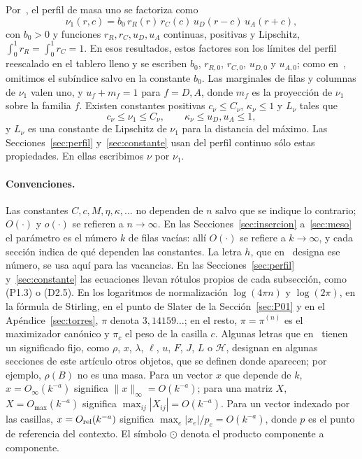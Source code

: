 Por~\cite[Teoremas~1.2 y~1.3 y Proposición~5.2]{Perfil}, el perfil de masa uno se factoriza como
\begin{equation}\label{eq:factorizacion}
 \nu_1(r,c)=b_0\,r_R(r)\,r_C(c)\,u_D(r-c)\,u_A(r+c),
\end{equation}
con $b_0>0$ y funciones $r_R,r_C,u_D,u_A$ continuas, positivas y Lipschitz, $\int_0^1r_R=\int_0^1r_C=1$.
En esos resultados, estos factores son los límites del perfil reescalado en el tablero lleno y
se escriben $b_0$, $r_{R,0}$, $r_{C,0}$, $u_{D,0}$ y $u_{A,0}$; como en~\cite{Completabilidad},
omitimos el subíndice salvo en la constante $b_0$.
Las marginales de filas y columnas de $\nu_1$ valen uno, y $u_f+m_f=1$ para $f=D,A$, donde
$m_f$ es la proyección de $\nu_1$ sobre la familia $f$. Existen constantes positivas
$c_\nu\le C_\nu$, $\kappa_\nu\le1$ y $L_\nu$ tales que
\[
 c_\nu\le\nu_1\le C_\nu,\qquad \kappa_\nu\le u_D,u_A\le1,
\]
y $L_\nu$ es una constante de Lipschitz de $\nu_1$ para la distancia del máximo. Las
Secciones~\ref{sec:perfil}
y~\ref{sec:constante} usan del perfil continuo sólo estas propiedades. En ellas escribimos $\nu$
por $\nu_1$.

\paragraph{Convenciones.}
Las constantes $C,c,M,\eta,\kappa,\dots$ no dependen de $n$ salvo que se indique lo contrario;
$O(\cdot)$ y $o(\cdot)$ se refieren a $n\to\infty$. En las Secciones~\ref{sec:insercion}
a~\ref{sec:meso} el parámetro es el número $k$ de filas vacías: allí $O(\cdot)$ se refiere a
$k\to\infty$, y cada sección indica de qué dependen las constantes. La letra $h$, que
en~\cite{Completabilidad} designa ese número, se usa aquí para las vacancias. En las
Secciones~\ref{sec:perfil}
y~\ref{sec:constante} las ecuaciones llevan rótulos propios de cada subsección, como (P1.3) o (D2.5).
En los logaritmos de normalización $\log(4\pi n)$ y $\log(2\pi)$, en la fórmula de Stirling, en el
punto de Slater de la Sección~\ref{sec:P01} y en el Apéndice~\ref{sec:torres}, $\pi$ denota
$3{,}14159\ldots$; en el resto, $\pi=\pi^{(n)}$ es el maximizador canónico y $\pi_c$ el peso de la
casilla $c$. Algunas letras que en~\cite{Perfil} tienen un significado fijo, como $\rho$, $x$, $\lambda$,
$\ell$, $u$, $F$, $J$, $L$ o $\mathcal H$, designan en algunas secciones de este artículo otros objetos,
que se definen donde aparecen; por ejemplo, $\rho(B)$ no es una masa.
Para un vector $x$ que depende de $k$, $x=O_\infty(k^{-a})$ significa $\|x\|_\infty=O(k^{-a})$; para
una matriz $X$, $X=O_{\max}(k^{-a})$ significa $\max_{ij}|X_{ij}|=O(k^{-a})$. Para un vector indexado
por las casillas, $x=O_{\rm rel}(k^{-a})$ significa $\max_e|x_e|/p_e=O(k^{-a})$, donde $p$ es el punto
de referencia del contexto. El símbolo $\odot$ denota el producto componente a componente.

